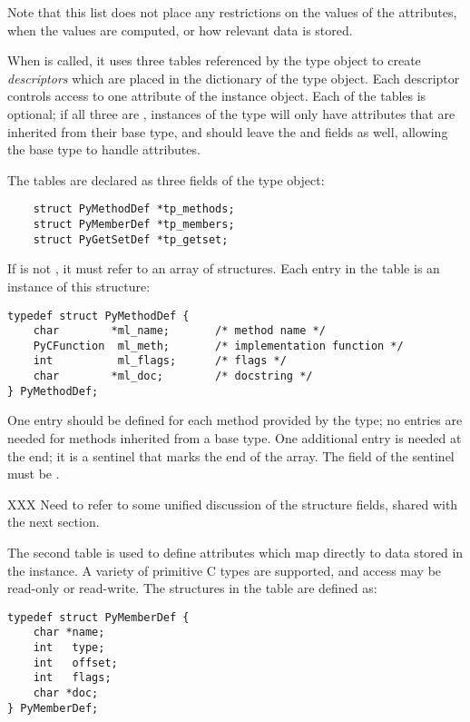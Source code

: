 Note that this list does not place any restrictions on the values of
the attributes, when the values are computed, or how relevant data is
stored.

When  is called, it uses three tables
referenced by the type object to create \emph{descriptors} which are
placed in the dictionary of the type object.  Each descriptor controls
access to one attribute of the instance object.  Each of the tables is
optional; if all three are \NULL, instances of the type will only have
attributes that are inherited from their base type, and should leave
the  and  fields \NULL{} as
well, allowing the base type to handle attributes.

The tables are declared as three fields of the type object:

\begin{verbatim}
    struct PyMethodDef *tp_methods;
    struct PyMemberDef *tp_members;
    struct PyGetSetDef *tp_getset;
\end{verbatim}

If  is not \NULL, it must refer to an array of
 structures.  Each entry in the table is an
instance of this structure:

\begin{verbatim}
typedef struct PyMethodDef {
    char        *ml_name;       /* method name */
    PyCFunction  ml_meth;       /* implementation function */
    int	         ml_flags;      /* flags */
    char        *ml_doc;        /* docstring */
} PyMethodDef;
\end{verbatim}

One entry should be defined for each method provided by the type; no
entries are needed for methods inherited from a base type.  One
additional entry is needed at the end; it is a sentinel that marks the
end of the array.  The  field of the sentinel must be
\NULL.

XXX Need to refer to some unified discussion of the structure fields,
shared with the next section.

The second table is used to define attributes which map directly to
data stored in the instance.  A variety of primitive C types are
supported, and access may be read-only or read-write.  The structures
in the table are defined as:

\begin{verbatim}
typedef struct PyMemberDef {
    char *name;
    int   type;
    int   offset;
    int   flags;
    char *doc;
} PyMemberDef;
\end{verbatim}

